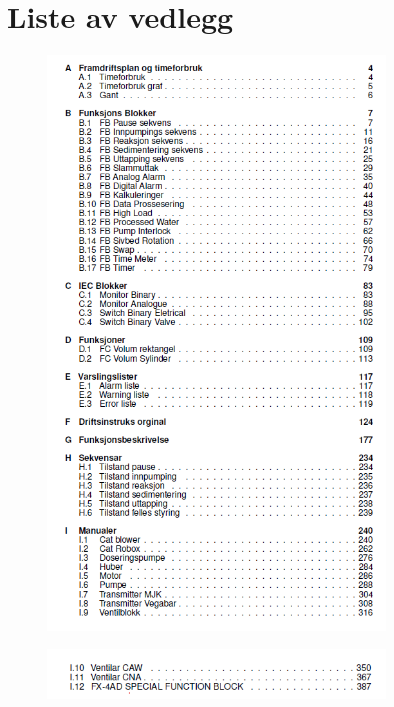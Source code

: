 
\chapter*{Liste av vedlegg}
\thispagestyle{fancy}

\begin{figure}[H]
    \centering
    \includegraphics[width=0.8\textwidth]{Appendix/ListeAvVedlegg1.png}
    \caption*{} %
    \label{fig:VedlegListe1}
\end{figure}

\begin{figure}[H]
    \centering
    \includegraphics[width=0.8\textwidth]{Appendix/ListeAvVedlegg2.png}
    \caption*{} %
    \label{fig:VedlegListe2}
\end{figure}
